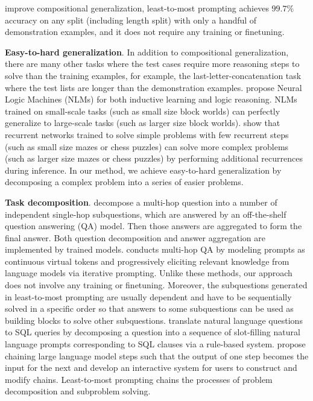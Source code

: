 \documentclass{article}
\begin{document}
improve compositional generalization, least-to-most prompting achieves $99.7\%$ accuracy on any split (including length split) with only a handful of demonstration examples, and it does not require any training or finetuning. %

\textbf{Easy-to-hard generalization}. In addition to compositional generalization, there are many other tasks where the test cases require more reasoning steps to solve than the training examples, for example, the last-letter-concatenation task where the test lists are longer than the demonstration examples. \cite{dong2018neural} propose Neural Logic Machines (NLMs) for both inductive learning and logic reasoning. NLMs trained on small-scale tasks (such as small size block worlds) can perfectly generalize to large-scale tasks (such as larger size block worlds). \cite{schwarzschild2021can} show that recurrent networks trained to solve simple problems with few recurrent steps (such as small size mazes or chess puzzles) can solve more complex problems (such as larger size mazes or chess puzzles) by performing additional recurrences during inference. In our method, we achieve easy-to-hard generalization by decomposing a complex problem into a series of easier problems.  

\textbf{Task decomposition}. \cite{perez2020unsupervised} decompose a multi-hop question into a number of independent single-hop subquestions, which are answered by an off-the-shelf question answering (QA) model. Then those answers are aggregated to form the final answer.  Both question decomposition and answer aggregation are implemented by trained models. \cite{wang2022shepherd} conducts multi-hop QA by modeling prompts as continuous virtual tokens and progressively eliciting relevant knowledge from language models via iterative prompting. Unlike these methods, our approach does not involve any training or finetuning. Moreover, the subquestions generated in least-to-most prompting are usually dependent and have to be sequentially solved in a specific order so that answers to some subquestions can be used as building blocks to solve other subquestions. \cite{yang2022seqzero} translate natural language questions to  SQL queries by decomposing a question into a sequence of slot-filling natural language prompts corresponding to SQL clauses via a rule-based system. \cite{wu2022ai} propose chaining large language model steps such that the output of one step becomes the input for the next and develop an interactive system for users to construct and modify chains. Least-to-most prompting chains the processes of problem decomposition and subproblem solving.
\end{document}
